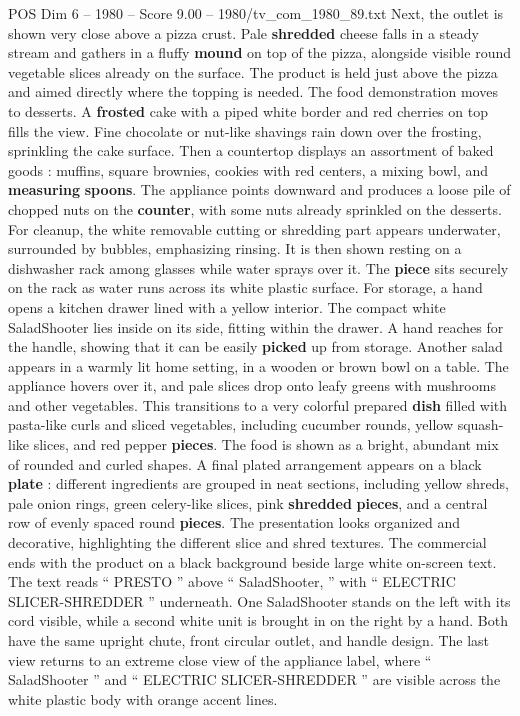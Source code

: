 \begin{textsample}{POS Dim 6 – 1980 – Score 9.00 – 1980/tv\_com\_1980\_89.txt}
Next, the outlet is shown very close above a pizza crust.
Pale \textbf{shredded} cheese falls in a steady stream and gathers in a fluffy \textbf{mound} on top of the pizza, alongside visible round vegetable slices already on the surface.
The product is held just above the pizza and aimed directly where the topping is needed.
The food demonstration moves to desserts.
A \textbf{frosted} cake with a piped white border and red cherries on top fills the view.
Fine chocolate or nut-like shavings rain down over the frosting, sprinkling the cake surface.
Then a countertop displays an assortment of baked goods : muffins, square brownies, cookies with red centers, a mixing bowl, and \textbf{measuring} \textbf{spoons}.
The appliance points downward and produces a loose pile of chopped nuts on the \textbf{counter}, with some nuts already sprinkled on the desserts.
For cleanup, the white removable cutting or shredding part appears underwater, surrounded by bubbles, emphasizing rinsing.
It is then shown resting on a dishwasher rack among glasses while water sprays over it.
The \textbf{piece} sits securely on the rack as water runs across its white plastic surface.
For storage, a hand opens a kitchen drawer lined with a yellow interior.
The compact white SaladShooter lies inside on its side, fitting within the drawer.
A hand reaches for the handle, showing that it can be easily \textbf{picked} up from storage.
Another salad appears in a warmly lit home setting, in a wooden or brown bowl on a table.
The appliance hovers over it, and pale slices drop onto leafy greens with mushrooms and other vegetables.
This transitions to a very colorful prepared \textbf{dish} filled with pasta-like curls and sliced vegetables, including cucumber rounds, yellow squash-like slices, and red pepper \textbf{pieces}.
The food is shown as a bright, abundant mix of rounded and curled shapes.
A final plated arrangement appears on a black \textbf{plate} : different ingredients are grouped in neat sections, including yellow shreds, pale onion rings, green celery-like slices, pink \textbf{shredded} \textbf{pieces}, and a central row of evenly spaced round \textbf{pieces}.
The presentation looks organized and decorative, highlighting the different slice and shred textures.
The commercial ends with the product on a black background beside large white on-screen text.
The text reads “ PRESTO ” above “ SaladShooter, ” with “ ELECTRIC SLICER-SHREDDER ” underneath.
One SaladShooter stands on the left with its cord visible, while a second white unit is brought in on the right by a hand.
Both have the same upright chute, front circular outlet, and handle design.
The last view returns to an extreme close view of the appliance label, where “ SaladShooter ” and “ ELECTRIC SLICER-SHREDDER ” are visible across the white plastic body with orange accent lines.

\end{textsample}
